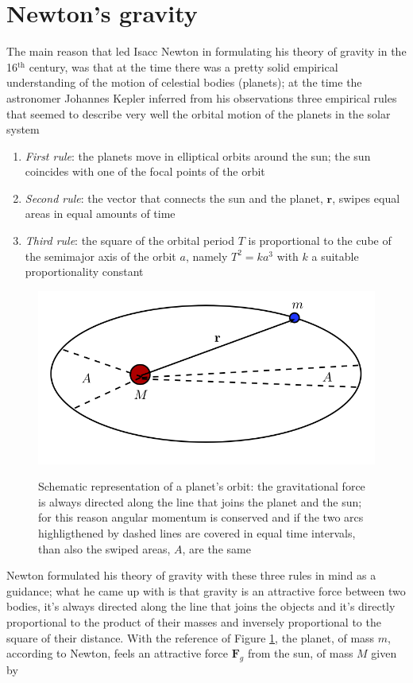 \documentclass[11pt, a4paper,oneside,openright]{book}
\numberwithin{equation}{section}
\begin{document}
\section{Newton's gravity}
The main reason that led Isacc Newton in formulating his theory of gravity in the 16$^{\mathrm{th}}$ century, was that at the time there was a pretty solid empirical understanding of the motion of celestial bodies (planets); at the time the astronomer Johannes Kepler inferred from his observations three empirical rules that seemed to describe very well the orbital motion of the planets in the solar system
\begin{enumerate}
\item \textit{First rule}: the planets move in elliptical orbits around the sun; the sun coincides with one of the focal points of the orbit
\item \textit{Second rule}: the vector that connects the sun and the planet, $\mathbf{r}$, swipes equal areas in equal amounts of time
\item \textit{Third rule}: the square of the orbital period $T$ is proportional to the cube of the semimajor axis of the orbit $a$, namely $T^2=ka^3$ with $k$ a suitable proportionality constant
\end{enumerate}
\begin{figure}
\begin{center}
\includegraphics[scale=0.7]{Draw/kepler.png}
\label{}
\end{center}
\caption{Schematic representation of a planet's orbit: the gravitational force is always directed along the line that joins the planet and the sun; for this reason angular momentum is conserved and if the two arcs highligthened by dashed lines are covered in equal time intervals, than also the swiped areas, $A$, are the same}
\label{kepler}
\end{figure}
Newton formulated his theory of gravity with these three rules in mind as a guidance; what he came up with is that gravity is an attractive force between two bodies, it's always directed along the line that joins the objects and it's directly proportional to the product of their masses and inversely proportional to the square of their distance. With the reference of Figure \ref{kepler}, the planet, of mass $m$, according to Newton, feels an attractive force $\mathbf{F}_g$ from the sun, of mass $M$ given by
\end{document}
